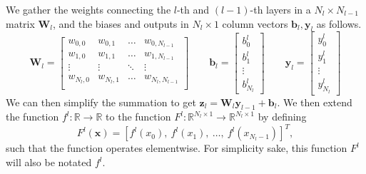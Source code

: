 \documentclass{article}
\theoremstyle{definition}
\begin{document}
We gather the weights connecting the $l$-th and $(l-1)$-th layers in a $N_{l} \times N_{l-1}$ matrix $\mathbf{W}_l$, and the biases and outputs in $N_l \times 1$ column vectors $\mathbf{b}_l, \mathbf{y}_l$ as follows.
\begin{equation*}
    \mathbf{W}_l = 
    \begin{bmatrix}
        w_{0,0} & w_{0,1} & \ldots & w_{0,N_{l-1}} \\
        w_{1,0} & w_{1,1} & \ldots & w_{1,N_{l-1}} \\
        \vdots & \vdots & \ddots & \vdots \\
        w_{N_{l},0} & w_{N_{l},1} & \ldots & w_{N_{l},N_{l-1}} \\
    \end{bmatrix}
    \qquad
    \mathbf{b}_l =
    \begin{bmatrix}
        b_0^l \\ b_1^l \\ \vdots \\ b_{N_l}^l
    \end{bmatrix}
    \qquad
    \mathbf{y}_l =
    \begin{bmatrix}
        y_0^l \\ y_1^l \\ \vdots \\ y_{N_l}^l
    \end{bmatrix}
\end{equation*}
We can then simplify the summation to get $\mathbf{z}_l = \mathbf{W}_l \mathbf{y}_{l-1} + \mathbf{b}_l$. We then extend the function $f^l: \mathbb{R} \to \mathbb{R}$ to the function $F^l: \mathbb{R}^{N_l \times 1} \to \mathbb{R}^{N_l \times 1}$ by defining
\begin{equation*}
    F^l(\boldsymbol{x}) = \left[ f^l \left( x_0 \right), \ f^l \left( x_1 \right), \ \ldots, \ f^l \left( x_{N_l - 1} \right) \right]^T,
\end{equation*}
such that the function operates elementwise. For simplicity sake, this function $F^l$ will also be notated $f^l$.
\end{document}
